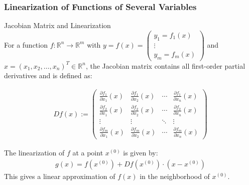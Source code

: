 \subsubsection{Linearization of Functions of Several Variables}

\begin{definition}{Jacobian Matrix and Linearization}\\
For a function $f: \mathbb{R}^n \rightarrow \mathbb{R}^m$ with $y = f(x) = \begin{pmatrix} y_1 = f_1(x) \\ \vdots \\ y_m = f_m(x) \end{pmatrix}$ and $x = (x_1, x_2, \ldots, x_n)^T \in \mathbb{R}^n$, the Jacobian matrix contains all first-order partial derivatives and is defined as:

\begin{align*}
Df(x) := \begin{pmatrix} 
\frac{\partial f_1}{\partial x_1}(x) & \frac{\partial f_1}{\partial x_2}(x) & \cdots & \frac{\partial f_1}{\partial x_n}(x) \\
\frac{\partial f_2}{\partial x_1}(x) & \frac{\partial f_2}{\partial x_2}(x) & \cdots & \frac{\partial f_2}{\partial x_n}(x) \\
\vdots & \vdots & \ddots & \vdots \\
\frac{\partial f_m}{\partial x_1}(x) & \frac{\partial f_m}{\partial x_2}(x) & \cdots & \frac{\partial f_m}{\partial x_n}(x)
\end{pmatrix}
\end{align*}

The linearization of $f$ at a point $x^{(0)}$ is given by:
\begin{align*}
g(x) = f(x^{(0)}) + Df(x^{(0)}) \cdot (x - x^{(0)})
\end{align*}
This gives a linear approximation of $f(x)$ in the neighborhood of $x^{(0)}$.
\end{definition}

